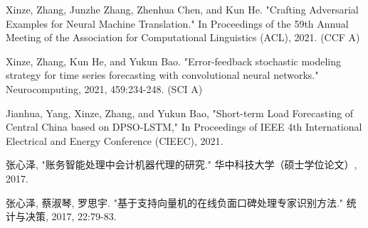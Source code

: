 
\begin{cventries}
    \vspace{-1.5mm}
    \cvpapers
    {
        \begin{cvitems}
            \item {Xinze, Zhang, Junzhe Zhang, Zhenhua Chen, and Kun He. "Crafting Adversarial Examples for Neural Machine Translation." In Proceedings of the 59th Annual Meeting of the Association for Computational Linguistics (ACL), 2021. (CCF A)}
            \item {Xinze, Zhang, Kun He, and Yukun Bao. "Error-feedback stochastic modeling strategy for time series forecasting with convolutional neural networks." Neurocomputing, 2021, 459:234-248. (SCI A)}
            \item {Jianhua, Yang, Xinze, Zhang, and Yukun Bao, "Short-term Load Forecasting of Central China based on DPSO-LSTM," In Proceedings of IEEE 4th International Electrical and Energy Conference (CIEEC), 2021.}
            \item {张心泽, "账务智能处理中会计机器代理的研究." 华中科技大学（硕士学位论文）, 2017.}
            \item {张心泽, 蔡淑琴, 罗思宇. "基于支持向量机的在线负面口碑处理专家识别方法." 统计与决策, 2017, 22:79-83.}
        \end{cvitems}
    }
\end{cventries}